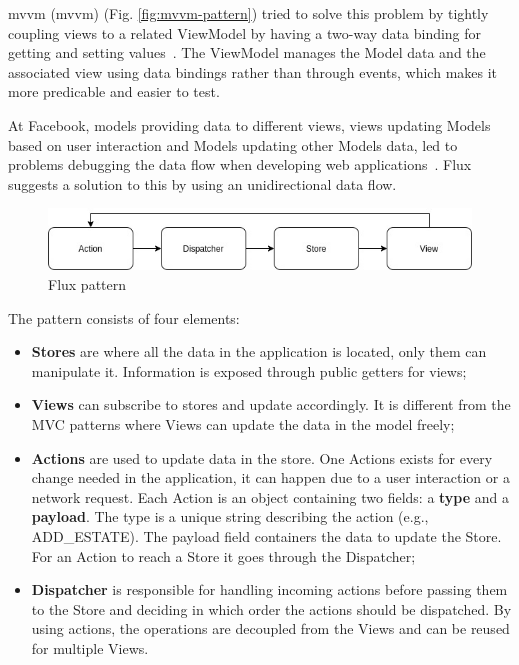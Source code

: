 \acrlong{mvvm} (\acrshort{mvvm}) (Fig. \ref{fig:mvvm-pattern}) tried to solve this problem by tightly coupling views to a related ViewModel by having a two-way data binding for getting and setting values~\cite{mvvm-problems}. The ViewModel manages the Model data and the associated view using data bindings rather than through events, which makes it more predicable and easier to test.

At Facebook, models providing data to different views, views updating Models based on user interaction and Models updating other Models data, led to problems debugging the data flow when developing web applications~\cite{facebook-debugging-problems}. Flux suggests a solution to this by using an unidirectional data flow.

\begin{figure}[H]
	\centering
	\includegraphics[width=1\linewidth]{Chapters/img/2_background/flux-pattern.jpg}
	\caption{Flux pattern}
	\label{fig:flux-pattern}
\end{figure}

The pattern consists of four elements:

\begin{itemize}
    \item \textbf{Stores} are where all the data in the application is located, only them can manipulate it. Information is exposed through public getters for views;
    \item \textbf{Views} can subscribe to stores and update accordingly. It is different from the MVC patterns where Views can update the data in the model freely;
    \item \textbf{Actions} are used to update data in the store. One Actions exists for every change needed in the application, it can happen due to a user interaction or a network request. Each Action is an object containing two fields: a \textbf{type} and a \textbf{payload}. The type is a unique string describing the action (e.g., ADD\_ESTATE). The payload field containers the data to update the Store. For an Action to reach a Store it goes through the Dispatcher;
    \item \textbf{Dispatcher} is responsible for handling incoming actions before passing them to the Store and deciding in which order the actions should be dispatched. By using actions, the operations are decoupled from the Views and can be reused for multiple Views.
\end{itemize}

